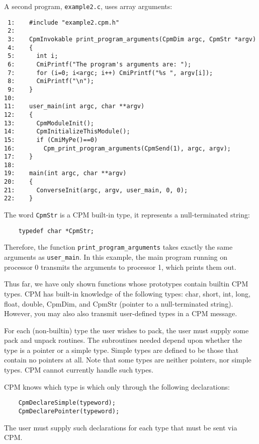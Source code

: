 A second program, {\tt example2.c}, uses array arguments:

\begin{verbatim}
 1:    #include "example2.cpm.h"
 2:   
 3:    CpmInvokable print_program_arguments(CpmDim argc, CpmStr *argv)
 4:    {
 5:      int i;
 6:      CmiPrintf("The program's arguments are: ");
 7:      for (i=0; i<argc; i++) CmiPrintf("%s ", argv[i]);
 8:      CmiPrintf("\n");
 9:    }
10:
11:    user_main(int argc, char **argv)
12:    {
13:      CpmModuleInit();
14:      CpmInitializeThisModule();
15:      if (CmiMyPe()==0)
16:        Cpm_print_program_arguments(CpmSend(1), argc, argv);
17:    }
18:
19:    main(int argc, char **argv)
20:    {
21:      ConverseInit(argc, argv, user_main, 0, 0);
22:    }
\end{verbatim}

The word {\tt CpmStr} is a CPM built-in type, it represents a
null-terminated string:

\begin{verbatim}
	typedef char *CpmStr;
\end{verbatim}

Therefore, the function {\tt print\_program\_arguments} takes exactly
the same arguments as {\tt user\_main}.  In this example, the main
program running on processor 0 transmits the arguments to processor 1,
which prints them out.

Thus far, we have only shown functions whose prototypes contain
builtin CPM types.  CPM has built-in knowledge of the following types:
char, short, int, long, float, double, CpmDim, and CpmStr (pointer to
a null-terminated string).  However, you may also also transmit
user-defined types in a CPM message.

For each (non-builtin) type the user wishes to pack, the user must
supply some pack and unpack routines.  The subroutines needed depend
upon whether the type is a pointer or a simple type.  Simple types are
defined to be those that contain no pointers at all.  Note that some
types are neither pointers, nor simple types.  CPM cannot currently
handle such types.

CPM knows which type is which only through the following declarations:

\begin{verbatim}
    CpmDeclareSimple(typeword);
    CpmDeclarePointer(typeword);
\end{verbatim}

The user must supply such declarations for each type that must be sent
via CPM.


